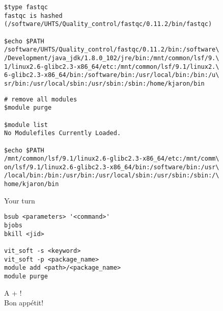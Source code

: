 \documentclass[xcolor=dvipsnames]{beamer}
\begin{document}
\begin{frame}[fragile]
\footnotesize
\begin{verbatim}
$type fastqc
fastqc is hashed 
(/software/UHTS/Quality_control/fastqc/0.11.2/bin/fastqc)

$echo $PATH
/software/UHTS/Quality_control/fastqc/0.11.2/bin:/software\
/Development/java_jdk/1.8.0_102/jre/bin:/mnt/common/lsf/9.\
1/linux2.6-glibc2.3-x86_64/etc:/mnt/common/lsf/9.1/linux2.\
6-glibc2.3-x86_64/bin:/software/bin:/usr/local/bin:/bin:/u\
sr/bin:/usr/local/sbin:/usr/sbin:/sbin:/home/kjaron/bin
\end{verbatim}
\end{frame}

\begin{frame}[fragile]
\footnotesize
\begin{verbatim}
# remove all modules
$module purge

$module list
No Modulefiles Currently Loaded.

$echo $PATH
/mnt/common/lsf/9.1/linux2.6-glibc2.3-x86_64/etc:/mnt/comm\
on/lsf/9.1/linux2.6-glibc2.3-x86_64/bin:/software/bin:/usr\
/local/bin:/bin:/usr/bin:/usr/local/sbin:/usr/sbin:/sbin:/\
home/kjaron/bin
\end{verbatim}
\end{frame}

\begin{frame}[fragile]
	\begin{center}
		\Huge
		Your turn
	\end{center}
\begin{verbatim}
bsub <parameters> '<command>'
bjobs
bkill <jid>

vit_soft -s <keyword>
vit_soft -p <package_name>
module add <path>/<package_name>
module purge
\end{verbatim}
\end{frame}


\begin{frame}
	\begin{center}
		\Huge
		A + !\\
		Bon appétit!\\
	\end{center}
\end{frame}
\end{document}
